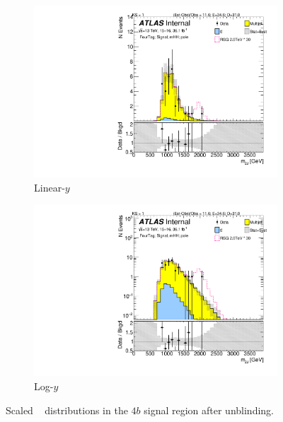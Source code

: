 \begin{figure}[htb!]
\begin{center}
    \captionsetup{justification=centering}
    \begin{subfigure}[b]{0.45\textwidth}
        \includegraphics[width=\textwidth,angle=-90]{figures/boosted/Signal_Syst/Moriond_bkg_9_FourTag_Signal_mHH_pole.pdf}
        \caption{Linear-$y$}
        \label{fig:boosted-4b-signal-pole-lin}
    \end{subfigure}
    \quad
    \begin{subfigure}[b]{0.45\textwidth}
        \includegraphics[width=\textwidth,angle=-90]{figures/boosted/Signal_Syst/Moriond_bkg_9_FourTag_Signal_mHH_pole_1.pdf}
        \caption{Log-$y$}
        \label{fig:boosted-4b-signal-pole-log}
    \end{subfigure}
  \caption{Scaled \mtwoJ~ distributions in the $4b$ signal region after unblinding.}
  \label{fig:boosted-4b-signal-pole}
\end{center}
\end{figure}


